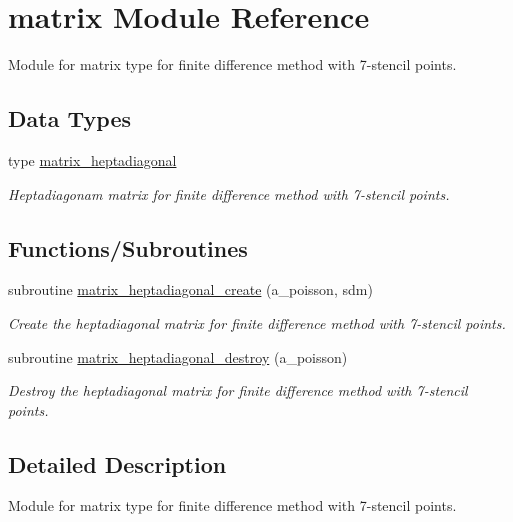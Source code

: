 \hypertarget{namespacematrix}{}\section{matrix Module Reference}
\label{namespacematrix}


Module for matrix type for finite difference method with 7-\/stencil points.  


\subsection*{Data Types}
\begin{DoxyCompactItemize}
\item 
type \hyperlink{structmatrix_1_1matrix__heptadiagonal}{matrix\+\_\+heptadiagonal}
\begin{DoxyCompactList}\small\item\em Heptadiagonam matrix for finite difference method with 7-\/stencil points. \end{DoxyCompactList}\end{DoxyCompactItemize}
\subsection*{Functions/\+Subroutines}
\begin{DoxyCompactItemize}
\item 
subroutine \hyperlink{namespacematrix_af96fcc5a5c79a720967847d6569ce479}{matrix\+\_\+heptadiagonal\+\_\+create} (a\+\_\+poisson, sdm)
\begin{DoxyCompactList}\small\item\em Create the heptadiagonal matrix for finite difference method with 7-\/stencil points. \end{DoxyCompactList}\item 
subroutine \hyperlink{namespacematrix_a1c201958a669deaddeb6aa76251b394f}{matrix\+\_\+heptadiagonal\+\_\+destroy} (a\+\_\+poisson)
\begin{DoxyCompactList}\small\item\em Destroy the heptadiagonal matrix for finite difference method with 7-\/stencil points. \end{DoxyCompactList}\end{DoxyCompactItemize}


\subsection{Detailed Description}
Module for matrix type for finite difference method with 7-\/stencil points. 

